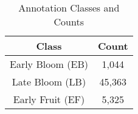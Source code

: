 
\begin{table}[!ht]
\centering
\caption{Annotation Classes and Counts}
\label{tab:Annotation Classes and Counts}
\footnotesize
\setlength{\tabcolsep}{6pt}
\begin{tabular}{cc}
\toprule
\textbf{Class} & \textbf{Count} \\
\midrule
Early Bloom (EB)  & 1,044 \\
Late Bloom (LB)   & 45,363 \\
Early Fruit (EF)  & 5,325 \\
\bottomrule
\end{tabular}
\end{table}
